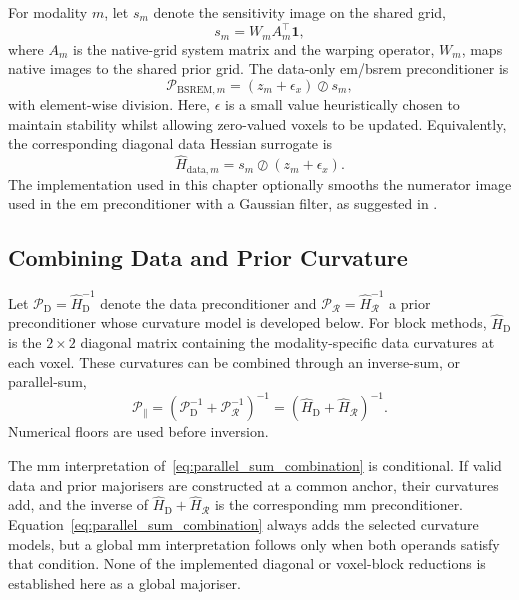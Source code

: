 For modality $m$, let $s_m$ denote the sensitivity image on the shared grid,
\begin{equation}
    s_m
    =
    W_m A_m^\top \bm 1,
    \label{eq:shared_grid_sensitivity}
\end{equation}
where $A_m$ is the native-grid system matrix and the warping operator, $W_m$, maps native images to the shared prior grid. The data-only \gls{em}/\gls{bsrem} preconditioner is
\begin{equation}
    \mathcal{P}_{\mathrm{BSREM},m}
    =
    (z_m+\epsilon_x)\oslash s_m,
    \label{eq:bsrem_preconditioner}
\end{equation}
with element-wise division. Here, $\epsilon$ is a small value heuristically chosen to maintain stability whilst allowing zero-valued voxels to be updated. Equivalently, the corresponding diagonal data Hessian surrogate is
\begin{equation}
    \widehat H_{\mathrm{data},m}
    =
    s_m \oslash (z_m+\epsilon_x).
    \label{eq:data_hessian_surrogate}
\end{equation}
The implementation used in this chapter optionally smooths the numerator image used in the \gls{em} preconditioner with a Gaussian filter, as suggested in \cite{ehrhardtFastPETReconstruction2025}.

\subsection{Combining Data and Prior Curvature}
\label{subsec:optimisation_preconditioner_combination}

Let $\mathcal{P}_{\mathrm D}=\widehat H_{\mathrm D}^{-1}$ denote the data preconditioner and $\mathcal{P}_{\mathcal R}=\widehat H_{\mathcal R}^{-1}$ a prior preconditioner whose curvature model is developed below. For block methods, $\widehat H_{\mathrm D}$ is the $2\times2$ diagonal matrix containing the modality-specific data curvatures at each voxel. These curvatures can be combined through an inverse-sum, or parallel-sum,
\begin{equation}
    \mathcal{P}_{\parallel}
    =
    \left(\mathcal{P}_{\mathrm D}^{-1}+\mathcal{P}_{\mathcal R}^{-1}\right)^{-1}
    =
    \left(\widehat H_{\mathrm D}+\widehat H_{\mathcal R}\right)^{-1}.
    \label{eq:parallel_sum_combination}
\end{equation}
Numerical floors are used before inversion.

The \gls{mm} interpretation of~\eqref{eq:parallel_sum_combination} is conditional. If valid data and prior majorisers are constructed at a common anchor, their curvatures add, and the inverse of $\widehat H_{\mathrm D}+\widehat H_{\mathcal R}$ is the corresponding \gls{mm} preconditioner. Equation~\eqref{eq:parallel_sum_combination} always adds the selected curvature models, but a global \gls{mm} interpretation follows only when both operands satisfy that condition. None of the implemented diagonal or voxel-block reductions is established here as a global majoriser.

